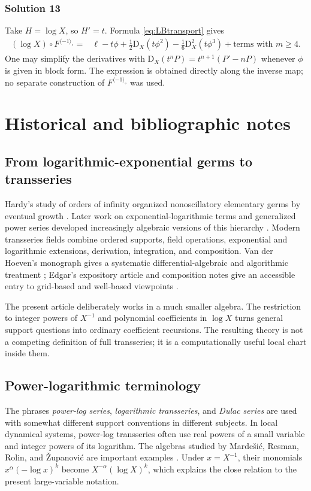 \documentclass[11pt,oneside,openany]{book}
\newcommand{\compose}{\mathbin{\circ}}
\newcommand{\rev}{^{\langle-1\rangle_{\circ}}}
\newcommand{\D}{\mathrm{D}}
\begin{document}
\subsection*{Solution 13}
Take \(H=\log X\), so \(H'=t\).  Formula \cref{eq:LBtransport} gives
\begin{align*}
 (\log X)\compose F\rev
 ={}&\ell-t\phi
 +\frac12\D_X(t\phi^2)
 -\frac16\D_X^2(t\phi^3)
 +\text{terms with }m\geq4.
\end{align*}
One may simplify the derivatives with
\(\D_X(t^nP)=t^{n+1}(P'-nP)\) whenever \(\phi\) is given in block form.
The expression is obtained directly along the inverse map; no separate
construction of \(F\rev\) was used.


\chapter{Historical and bibliographic notes}
\label{app:history}

\section{From logarithmic-exponential germs to transseries}
Hardy's study of orders of infinity organized nonoscillatory elementary germs
by eventual growth \cite{Hardy1910}.  Later work on exponential-logarithmic
terms and generalized power series developed increasingly algebraic versions
of this hierarchy \cite{DahnGoering1987,vanDenDriesMacintyreMarker1997,
vanDenDriesMacintyreMarker2001}.  Modern transseries fields combine ordered
supports, field operations, exponential and logarithmic extensions,
derivation, integration, and composition.  Van der Hoeven's monograph gives a
systematic differential-algebraic and algorithmic treatment
\cite{vanDerHoeven2006}; Edgar's expository article and composition notes give
an accessible entry to grid-based and well-based viewpoints
\cite{EdgarBeginners,EdgarComposition}.

The present article deliberately works in a much smaller algebra.  The
restriction to integer powers of \(X^{-1}\) and polynomial coefficients in
\(\log X\) turns general support questions into ordinary coefficient
recursions.  The resulting theory is not a competing definition of full
transseries; it is a computationally useful local chart inside them.

\section{Power-logarithmic terminology}
The phrases \emph{power-log series}, \emph{logarithmic transseries}, and
\emph{Dulac series} are used with somewhat different support conventions in
different subjects.  In local dynamical systems, power-log transseries often
use real powers of a small variable and integer powers of its logarithm.  The
algebras studied by Marde\v{s}i\'c, Resman, Rolin, and
\v{Z}upanovi\'c are important examples \cite{MardesicEtAl2016}.  Under
\(x=X^{-1}\), their monomials \(x^\alpha(-\log x)^k\) become
\(X^{-\alpha}(\log X)^k\), which explains the close relation to the present
large-variable notation.
\end{document}
